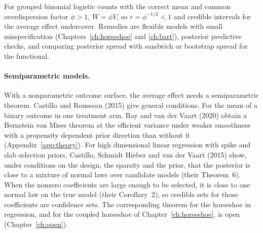 For grouped binomial logistic counts with the correct mean and common overdispersion factor $\phi>1$, $W=\phi V$, so $r=\phi^{-1/2}<1$ and credible intervals for the average effect undercover. Remedies are flexible models with small misspecification (Chapters~\ref{ch:horseshoe} and \ref{ch:bart}), posterior predictive checks, and comparing posterior spread with sandwich or bootstrap spread for the functional.

\paragraph{Semiparametric models.} With a nonparametric outcome surface, the average effect needs a semiparametric theorem. Castillo and Rousseau (2015) give general conditions. For the mean of a binary outcome in one treatment arm, Ray and van der Vaart (2020) obtain a Bernstein von Mises theorem at the efficient variance under weaker smoothness with a propensity dependent prior direction than without it (Appendix~\ref{app:theory}). For high dimensional linear regression with spike and slab selection priors, Castillo, Schmidt Hieber and van der Vaart (2015) show, under conditions on the design, the sparsity and the prior, that the posterior is close to a mixture of normal laws over candidate models (their Theorem~6). When the nonzero coefficients are large enough to be selected, it is close to one normal law on the true model (their Corollary~2), so credible sets for those coefficients are confidence sets. The corresponding theorem for the horseshoe in regression, and for the coupled horseshoe of Chapter~\ref{ch:horseshoe}, is open (Chapter~\ref{ch:open}).

